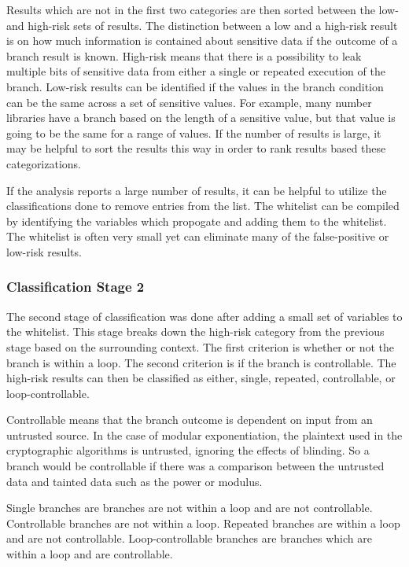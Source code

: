 \documentclass[11pt,a4paper]{article}
\begin{document}
 Results which are not in the first two categories are then sorted between the
 low- and high-risk sets of results. The distinction between a low and a
 high-risk result is on how much information is contained about sensitive data
 if the outcome of a branch result is known. High-risk means that there is a
 possibility to leak multiple bits of sensitive data from either a single or
 repeated execution of the branch. Low-risk results can be identified if the
 values in the branch condition can be the same across a set of sensitive
 values. For example, many number libraries have a branch based on the length of
 a sensitive value, but that value is going to be the same for a range of
 values. If the number of results is large, it may be helpful to sort the
 results this way in order to rank results based these categorizations.
 
 If the analysis reports a large number of results, it can be helpful to utilize
 the classifications done to remove entries from the list. The whitelist can be
 compiled by identifying the variables which propogate and adding them to the
 whitelist. The whitelist is often very small yet can eliminate many of the
 false-positive or low-risk results.

 \subsubsection{Classification Stage 2}

 The second stage of classification was done after adding a small set of
 variables to the whitelist. This stage breaks down the high-risk category from the
 previous stage based on the surrounding context. The first criterion is whether
 or not the branch is within a loop. The second criterion is if the branch is
 controllable. The high-risk results can then be classified as either, single,
 repeated, controllable, or loop-controllable.

 Controllable means that the branch outcome is dependent on input from an
 untrusted source. In the case of modular exponentiation, the plaintext used in
 the cryptographic algorithms is untrusted, ignoring the effects of blinding. So
 a branch would be controllable if there was a comparison between the untrusted
 data and tainted data such as the power or modulus.

 Single branches are branches are not within a loop and are not controllable.
 Controllable branches are not within a loop. Repeated branches are within a
 loop and are not controllable. Loop-controllable branches are branches which
 are within a loop and are controllable.
\end{document}
